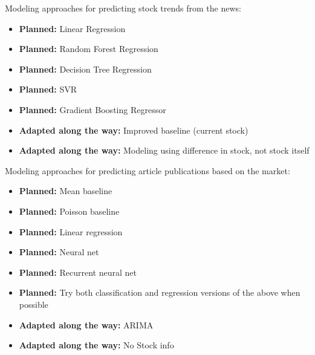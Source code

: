 \documentclass{article}
\begin{document}
\vspace{0.1 in}

{Modeling approaches for predicting stock trends from the news:}
\begin{itemize}
    \item \textbf{Planned:} Linear Regression
    \item \textbf{Planned:} Random Forest Regression
    \item \textbf{Planned:} Decision Tree Regression
    \item \textbf{Planned:} SVR
    \item \textbf{Planned:} Gradient Boosting Regressor
    \item \textbf{Adapted along the way:} Improved baseline (current stock)
    \item \textbf{Adapted along the way:} Modeling using difference in stock, not stock itself
\end{itemize}

\vspace{0.1 in}


{Modeling approaches for predicting article publications based on the market:}
\begin{itemize}
    \item \textbf{Planned:} Mean baseline
    \item \textbf{Planned:} Poisson baseline
    \item \textbf{Planned:} Linear regression
    \item \textbf{Planned:} Neural net
    \item \textbf{Planned:} Recurrent neural net
    \item \textbf{Planned:} Try both classification and regression versions of the above when possible
    \item \textbf{Adapted along the way:}  ARIMA
    \item \textbf{Adapted along the way:} No Stock info
\end{itemize}
\end{document}
